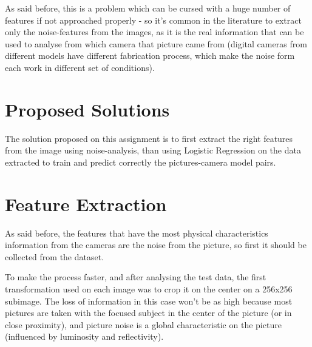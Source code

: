 \documentclass[10pt,twocolumn,letterpaper]{article}
\begin{document}
As said before, this is a problem which can be cursed with a huge number of features if not approached properly - so it's common in the literature to extract only the noise-features from the images, as it is the real information that can be used to analyse from which camera that picture came from (digital cameras from different models have different fabrication process, which make the noise form each work in different set of conditions).

\section{Proposed Solutions}
The solution proposed on this assignment is to first extract the right features from the image using noise-analysis, than using Logistic Regression on the data extracted to train and predict correctly the pictures-camera model pairs.

\section{Feature Extraction}
As said before, the features that have the most physical characteristics information from the cameras are the noise from the picture, so first it should be collected from the dataset.

To make the process faster, and after analysing the test data, the first transformation used on each image was to crop it on the center on a 256x256 subimage. The loss of information in this case won't be as high because most pictures are taken with the focused subject in the center of the picture (or in close proximity), and picture noise is a global characteristic on the picture (influenced by luminosity and reflectivity).
\end{document}
